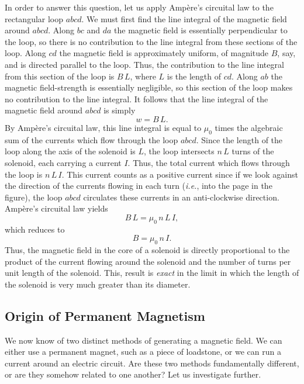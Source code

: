 In order to answer this question, let us apply Amp\`{e}re's circuital
law to the rectangular loop $abcd$. We must first find the line integral
of the magnetic field around $abcd$. Along $bc$ and $da$ the magnetic field
is essentially perpendicular to the loop, so there is no contribution to
the line integral from these sections of the loop. 
Along $cd$ the magnetic field is approximately uniform,
of magnitude $B$, say, and is directed parallel to the loop. Thus, the
contribution to the line integral from this section of the loop
is $B\,L$, where $L$ is the length of $cd$. 
Along $ab$ the magnetic field-strength is essentially negligible, so
this section of the loop makes no contribution to the line
integral. It follows that the line integral of the
magnetic field around $abcd$ is simply
\begin{equation}
w = B\,L.
\end{equation}
By  Amp\`{e}re's circuital law, this line integral is equal to $\mu_0$
times the algebraic sum of
the currents which flow through the loop $abcd$. Since the length of the
loop along the axis of the solenoid is $L$, the loop intersects $n\,L$
turns of the solenoid, each carrying a current $I$. Thus, the total
current which flows through the loop is $n\,L\,I$. This current counts as
a positive current since if we look against the direction of the
currents flowing in each turn 
 ({\em i.e.}, into the page in the figure), the loop $abcd$ circulates
these currents in an anti-clockwise direction. Amp\`{e}re's circuital law yields
\begin{equation}
B\,L  =  \mu_0\, n\,L\,I,
\end{equation}
which reduces to
\begin{equation}
B =\mu_0\,n\,I.
\end{equation}
Thus, the magnetic field in the core of a solenoid is directly
proportional to the product of the
current flowing around the solenoid and the number
of turns per unit length of the solenoid. This, result is {\em exact}\/ in the
limit in which the length of the solenoid is very much greater than its diameter.

\subsection{Origin of Permanent Magnetism}
We now know of two distinct methods of generating a magnetic field. We can either use a
permanent magnet, such as a piece of loadstone, or we can run a current
around an electric circuit. Are these two methods fundamentally different, or
are they somehow related to one another? Let us investigate further.

